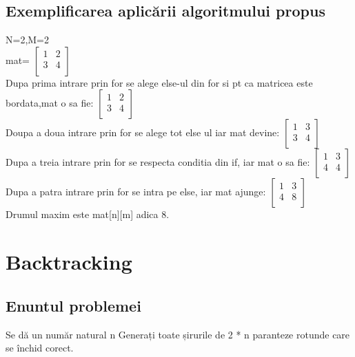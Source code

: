 \documentclass[runningheads]{llncs}
\begin{document}
\subsection{Exemplificarea aplicării algoritmului propus}
N=2,M=2\\
mat=
$\begin{bmatrix} 
	1 & 2 \\
	3 & 4  \\

\end{bmatrix}$\\
Dupa prima intrare prin for se alege else-ul din for si pt ca matricea este bordata,mat o sa fie:
$\begin{bmatrix} 
	1 & 2 \\
	3 & 4 \\ 

\end{bmatrix}$\\
Doupa a doua intrare prin for se alege tot else ul iar mat devine:
$\begin{bmatrix} 
	1 & 3 \\
	3 & 4  \\

\end{bmatrix}$\\
Dupa a treia intrare prin for se respecta conditia din if, iar mat o sa fie:
$\begin{bmatrix} 
	1 & 3 \\
	4 & 4  \\

\end{bmatrix}$
Dupa a patra intrare prin for se intra pe else, iar mat ajunge:
$\begin{bmatrix} 
	1 & 3 \\
	4 & 8  \\

\end{bmatrix}$\\
Drumul maxim este mat[n][m] adica 8.
\newpage
\section{Backtracking}
\subsection{Enuntul problemei}
Se dă un număr natural n Generați toate șirurile de 2 * n paranteze rotunde care se închid corect.
\end{document}
